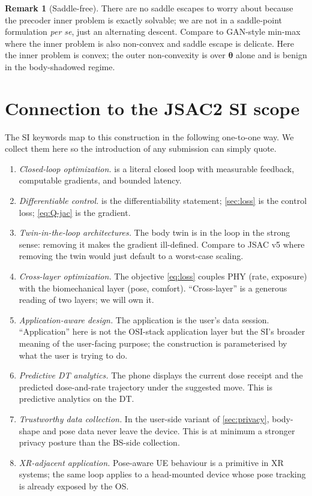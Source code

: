 \documentclass[11pt,a4paper]{article}
\theoremstyle{definition}
\newtheorem{remark}[remark]{Remark}
\newcommand{\thetab}{\bm{\theta}}
\begin{document}
\begin{remark}[Saddle-free]
There are no saddle escapes to worry about because the precoder
inner problem is exactly solvable; we are not in a saddle-point
formulation \emph{per se}, just an alternating descent.  Compare
to GAN-style min-max where the inner problem is also non-convex
and saddle escape is delicate.  Here the inner problem is convex;
the outer non-convexity is over $\thetab$ alone and is benign in
the body-shadowed regime.
\end{remark}

\section{Connection to the JSAC2 SI scope}\label{sec:si}

The SI keywords map to this construction in the following one-to-one
way.  We collect them here so the introduction of any submission
can simply quote.

\begin{enumerate}[leftmargin=1.6em,itemsep=3pt]
\item \emph{Closed-loop optimization.}   is a
literal closed loop with measurable feedback, computable
gradients, and bounded latency.
\item \emph{Differentiable control.}   is the
differentiability statement; \cref{sec:loss} is the control loss;
\eqref{eq:Q-jac} is the gradient.
\item \emph{Twin-in-the-loop architectures.}  The body twin is in
the loop in the strong sense: removing it makes the gradient
ill-defined.  Compare to JSAC v5 where removing the twin would
just default to a worst-case scaling.
\item \emph{Cross-layer optimization.}  The objective
\eqref{eq:loss} couples PHY (rate, exposure) with the
biomechanical layer (pose, comfort).  ``Cross-layer'' is a
generous reading of two layers; we will own it.
\item \emph{Application-aware design.}  The application is the
user's data session.  ``Application'' here is not the OSI-stack
application layer but the SI's broader meaning of the user-facing
purpose; the construction is parameterised by what the user is
trying to do.
\item \emph{Predictive DT analytics.}  The phone displays the
current dose receipt and the predicted dose-and-rate trajectory
under the suggested move.  This is predictive analytics on the
DT.
\item \emph{Trustworthy data collection.}  In the user-side
variant of \cref{sec:privacy}, body-shape and pose data never
leave the device.  This is at minimum a stronger privacy
posture than the BS-side collection.
\item \emph{XR-adjacent application.}  Pose-aware UE behaviour is
a primitive in XR systems; the same loop applies to a head-mounted
device whose pose tracking is already exposed by the OS.
\end{enumerate}
\end{document}
